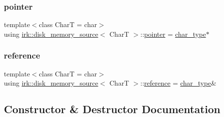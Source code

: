 \mbox{\label{classirk_1_1disk__memory__source_afa8b094a876a7f219c11ddb08ec77c3f}} 
\subsubsection{\texorpdfstring{pointer}{pointer}}
{\footnotesize\ttfamily template$<$class CharT  = char$>$ \\
using \mbox{\hyperlink{classirk_1_1disk__memory__source}{irk\+::disk\+\_\+memory\+\_\+source}}$<$ CharT $>$\+::\mbox{\hyperlink{classirk_1_1disk__memory__source_afa8b094a876a7f219c11ddb08ec77c3f}{pointer}} =  \mbox{\hyperlink{classirk_1_1disk__memory__source_a029ab1ba55fc543025c42ee3d7320dca}{char\+\_\+type}}$\ast$}

\mbox{\label{classirk_1_1disk__memory__source_ad150035660918d33c0f036e98781c59d}} 
\subsubsection{\texorpdfstring{reference}{reference}}
{\footnotesize\ttfamily template$<$class CharT  = char$>$ \\
using \mbox{\hyperlink{classirk_1_1disk__memory__source}{irk\+::disk\+\_\+memory\+\_\+source}}$<$ CharT $>$\+::\mbox{\hyperlink{classirk_1_1disk__memory__source_ad150035660918d33c0f036e98781c59d}{reference}} =  \mbox{\hyperlink{classirk_1_1disk__memory__source_a029ab1ba55fc543025c42ee3d7320dca}{char\+\_\+type}}\&}



\subsection{Constructor \& Destructor Documentation}
\mbox{\label{classirk_1_1disk__memory__source_ab36e14dfbd67bbbb71386dc7a59a49df}} 
